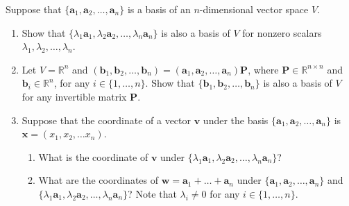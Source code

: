 \documentclass[11pt,letter,notitlepage]{article}
\theoremstyle{definition}
\begin{document}
	\begin{exercise}
		Suppose that $\{\mathbf{a}_1, \mathbf{a}_2,\dots,\mathbf{a}_n\}$ is a basis of an $n$-dimensional vector space $V$. 
		\begin{enumerate}
			\item Show that $\{\lambda_1 \mathbf{a}_1, \lambda_2 \mathbf{a}_2, \dots, \lambda_n\mathbf{a}_n\}$ is also a basis of $V$ for  nonzero scalars $\lambda_1,\lambda_2, \dots, \lambda_n$. 
			\item Let $V =\mathbb{R}^n$ and  $(\mathbf{b}_1,\mathbf{b}_2,\dots, \mathbf{b}_n) = (\mathbf{a}_1,\mathbf{a}_2, \dots, \mathbf{a}_n)\mathbf{P}$, where $\mathbf{P}\in \mathbb{R}^{n\times n}$ and $\mathbf{b}_i\in \mathbb{R}^n$, for any $i\in\{1,\dots,n\}$. Show that $\{ \mathbf{b}_1, \mathbf{b}_2, \dots, \mathbf{b}_n\}$ is also a basis of $V$ for any invertible  matrix $\mathbf{P}$.
			\item Suppose that the coordinate of a vector $\mathbf{v}$ under the basis $\{\mathbf{a}_1,  \mathbf{a}_2,\dots,\mathbf{a}_n\}$ is $\mathbf{x}=(x_1,x_2,\dots x_n)$.
			\begin{enumerate}
				\item What is the coordinate of $\mathbf{v}$ under $\{\lambda_1 \mathbf{a}_1, \lambda_2 \mathbf{a}_2, \dots, \lambda_n\mathbf{a}_n\}$? 
				
				\item What are the coordinates of $\mathbf{w} = \mathbf{a}_1+\dots + \mathbf{a}_n$ under $\{\mathbf{a}_1, \mathbf{a}_2,\dots,\mathbf{a}_n\}$ and $\{\lambda_1 \mathbf{a}_1, \lambda_2 \mathbf{a}_2, \dots, \lambda_n\mathbf{a}_n\}$? Note that  $\lambda_i \neq 0$ for any $i\in \{1,\dots,n\}$.
			\end{enumerate}
		\end{enumerate}
	\end{exercise}
	\begin{solution}
		
	\end{solution}
	
	
	\newpage
	
\end{document}
